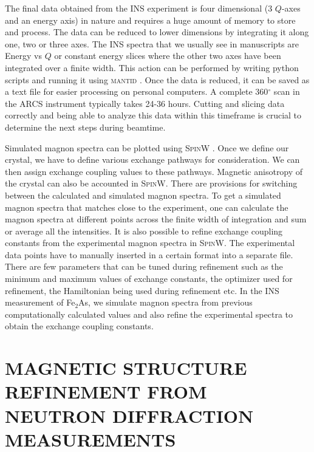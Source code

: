 \documentclass[letterpaper,10pt,doublespacing,edeposit]{uiucthesis2020}
\begin{document}
\begin{mainmatter}
The final data obtained from the INS experiment is four dimensional (3 $Q$-axes and an energy axis) in nature and requires a huge amount of memory to store and process. The data can be reduced to lower dimensions by integrating it along one, two or three axes. The INS spectra that we usually see in manuscripts are Energy vs $Q$ or constant energy slices where the other two axes have been integrated over a finite width. This action can be performed by writing python scripts and running it using \textsc{mantid} \cite{Arnold2014}. Once the data is reduced, it can be saved as a text file for easier processing on personal computers. A complete 360$^\circ$ scan in the ARCS instrument typically takes 24-36 hours. Cutting and slicing data correctly and being able to analyze this data within this timeframe is crucial to determine the next steps during beamtime.

Simulated magnon spectra can be plotted using \textsc{SpinW} \cite{Toth_2015}. Once we define our crystal, we have to define various exchange pathways for consideration. We can then assign exchange coupling values to these pathways. Magnetic anisotropy of the crystal can also be accounted in \textsc{SpinW}. There are provisions for switching between the calculated and simulated magnon spectra. To get a simulated magnon spectra that matches close to the experiment, one can calculate the magnon spectra at different points across the finite width of integration and sum or average all the intensities. It is also possible to refine exchange coupling constants from the experimental magnon spectra in \textsc{SpinW}. The experimental data points have to manually inserted in a certain format into a separate file. There are few parameters that can be tuned during refinement such as the minimum and maximum values of exchange constants, the optimizer used for refinement, the Hamiltonian being used during refinement etc. In the INS measurement of Fe$_2$As, we simulate magnon spectra from previous computationally calculated values and also refine the experimental spectra to obtain the exchange coupling constants.




\chapter{MAGNETIC STRUCTURE REFINEMENT FROM NEUTRON DIFFRACTION MEASUREMENTS}

\vspace{10mm}


\end{mainmatter}
\end{document}
